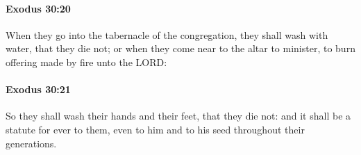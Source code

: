 		\paragraph{Exodus 30:20} %
			\label{EXODUS-30-20}

			When they go into the tabernacle of the congregation, they shall wash with water, that they die not; or when they come near to the altar to minister, to burn offering made by fire unto the LORD:


		\paragraph{Exodus 30:21} %
			\label{EXODUS-30-21}

			So they shall wash their hands and their feet, that they die not: and it shall be a statute for ever to them, even to him and to his seed throughout their generations.



